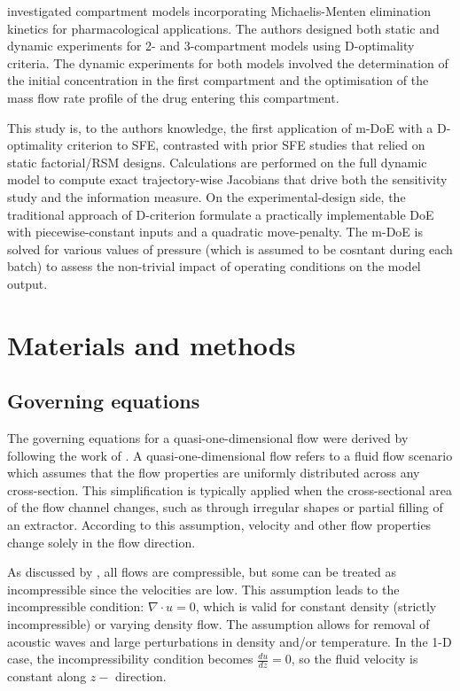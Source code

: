 \documentclass[a4paper,fleqn]{cas-dc}
\begin{document}
\citet{Duarte2019} investigated compartment models incorporating Michaelis-Menten elimination kinetics for pharmacological applications. The authors designed both static and dynamic experiments for 2- and 3-compartment models using D-optimality criteria. The dynamic experiments for both models involved the determination of the initial concentration in the first compartment and the optimisation of the mass flow rate profile of the drug entering this compartment.

This study is, to the authors knowledge, the first application of m-DoE with a D-optimality criterion to SFE, contrasted with prior SFE studies that relied on static factorial/RSM designs. Calculations are performed on the full dynamic model to compute exact trajectory-wise Jacobians that drive both the sensitivity study and the information measure. On the experimental-design side, the traditional approach of D-criterion formulate a practically implementable DoE with piecewise-constant inputs and a quadratic move-penalty. The m-DoE is solved for various values of pressure (which is assumed to be cosntant during each batch) to assess the non-trivial impact of operating conditions on the model output.


%
\section{Materials and methods} \label{CH: Materials and methods}

\subsection{Governing equations} \label{CH:Governing_equations_chapter}
The governing equations for a quasi-one-dimensional flow were derived by following the work of \citet{Anderson1995}. A quasi-one-dimensional flow refers to a fluid flow scenario which assumes that the flow properties are uniformly distributed across any cross-section. This simplification is typically applied when the cross-sectional area of the flow channel changes, such as through irregular shapes or partial filling of an extractor. According to this assumption, velocity and other flow properties change solely in the flow direction.

As discussed by \citet{Anderson2023}, all flows are compressible, but some can be treated as incompressible since the velocities are low. This assumption leads to the incompressible condition: $\nabla \cdot u =0$, which is valid for constant density (strictly incompressible) or varying density flow. The assumption allows for removal of acoustic waves and large perturbations in density and/or temperature. In the 1-D case, the incompressibility condition becomes $\frac{du}{dz} = 0$, so the fluid velocity is constant along $z-$ direction.
\end{document}
